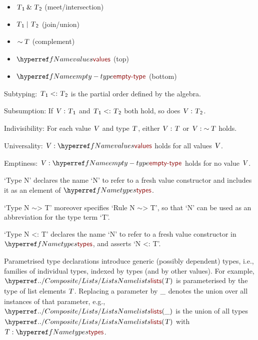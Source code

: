 \begin{itemize}
\item{} $\SHADE{\VAR{T}\SUB{1} \mathbin{\&} \VAR{T}\SUB{2}}$    (meet/intersection)
\item{} $\SHADE{\VAR{T}\SUB{1}  \mid \VAR{T}\SUB{2}}$    (join/union)
\item{} $\SHADE{\mathop{\sim} \VAR{T}}$        (complement)
\item{} $\SHADE{\NAMEREF{values}}$     (top)
\item{} $\SHADE{\NAMEREF{empty-type}}$ (bottom)
\end{itemize}

Subtyping: $\SHADE{\VAR{T}\SUB{1} <: \VAR{T}\SUB{2}}$ is the partial order defined by the algebra.

Subsumption: If $\SHADE{ \VAR{V} : \VAR{T}\SUB{1}}$ and $\SHADE{\VAR{T}\SUB{1} <: \VAR{T}\SUB{2}}$ both hold, so does $\SHADE{ \VAR{V} : \VAR{T}\SUB{2}}$.

Indivisibility: For each value $\SHADE{\VAR{V}}$ and type $\SHADE{\VAR{T}}$, either $\SHADE{ \VAR{V} : \VAR{T}}$ or
  $\SHADE{ \VAR{V} : \mathop{\sim} \VAR{T}}$ holds.

Universality: $\SHADE{ \VAR{V} : \NAMEREF{values}}$ holds for all values $\SHADE{\VAR{V}}$.

Emptiness: $\SHADE{ \VAR{V} : \NAMEREF{empty-type}}$ holds for no value $\SHADE{\VAR{V}}$.

`Type N' declares the name `N' to refer to a fresh value constructor
  and includes it as an element of $\SHADE{\NAMEREF{types}}$.

`Type N \ensuremath{\sim}\textgreater{} T' moreover specifies `Rule N \ensuremath{\sim}\textgreater{} T', so that `N' can be used as
  an abbreviation for the type term `T'.

`Type N \textless{}: T' declares the name `N' to refer to a fresh value constructor
  in $\SHADE{\NAMEREF{types}}$, and asserts `N \textless{}: T'.

Parametrised type declarations introduce generic (possibly dependent) types, 
  i.e., families of individual types, indexed by types (and by other values). 
  For example, $\SHADE{\NAMEHYPER{../Composite}{Lists}{lists}
           (  \VAR{T} )}$ is parameterised by the type of list elements $\SHADE{\VAR{T}}$.
  Replacing a parameter by $\strut\_\strut$ denotes the union over all instances of that
  parameter, e.g., $\SHADE{\NAMEHYPER{../Composite}{Lists}{lists}
           (  \_ )}$ is the union of all types $\SHADE{\NAMEHYPER{../Composite}{Lists}{lists}
           (  \VAR{T} )}$ with $\SHADE{\VAR{T} : \NAMEREF{types}}$.

